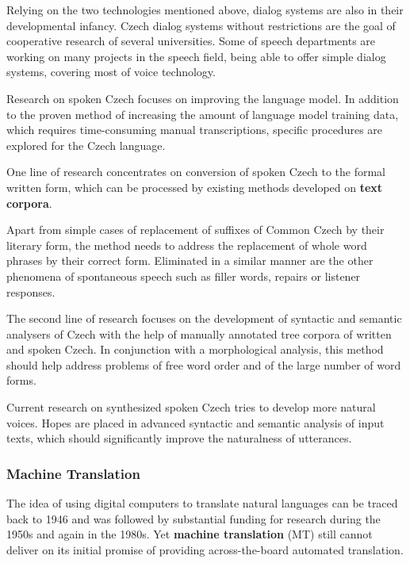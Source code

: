 \begin{multicols}{2}
Relying on the two technologies mentioned above, dialog systems are also in their developmental infancy. Czech dialog systems without restrictions are the goal of cooperative research of several universities. Some of speech departments are working on many projects in the speech field, being able to offer simple dialog systems, covering most of voice technology.

Research on spoken Czech focuses on improving the language model. In addition to the proven method of increasing the amount of language model training data, which requires time-consuming manual transcriptions, specific procedures are explored for the Czech language.

One line of research concentrates on conversion of spoken Czech to the formal written form, which can be processed by existing methods developed on \textbf{text corpora}.

Apart from simple cases of replacement of suffixes of Common Czech by their literary form, the method needs to address the replacement of whole word phrases by their correct form. Eliminated in a similar manner are the other phenomena of spontaneous speech such as filler words, repairs or listener responses.

The second line of research focuses on the development of syntactic and semantic analysers of Czech with the help of manually annotated tree corpora of written and spoken Czech. In conjunction with a morphological analysis, this method should help address problems of free word order and of the large number of word forms.

Current research on synthesized spoken Czech tries to develop more natural voices. Hopes are placed in advanced syntactic and semantic analysis of input texts, which should significantly improve the naturalness of utterances.

\subsubsection{Machine Translation}

The idea of using digital computers to translate natural languages can be traced back to 1946 and was followed by substantial funding for research during the 1950s and again in the 1980s. Yet \textbf{machine translation} (MT) still cannot deliver on its initial promise of providing across-the-board automated translation.


\end{multicols}
